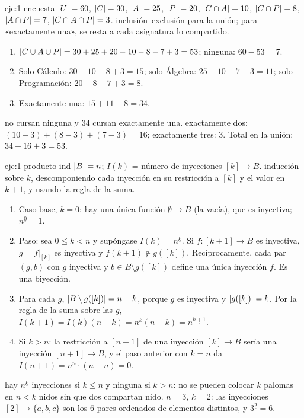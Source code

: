 \begin{solucion}{eje:1-encuesta}
\datos $\lvert U\rvert=60$, $\lvert C\rvert=30$, $\lvert A\rvert=25$, $\lvert P\rvert=20$, $\lvert C\cap A\rvert=10$, $\lvert C\cap P\rvert=8$, $\lvert A\cap P\rvert=7$, $\lvert C\cap A\cap P\rvert=3$.
\planteamiento inclusión--exclusión para la unión; para «exactamente una», se resta a cada asignatura lo compartido.
\pasos
\begin{enumerate}[label=\arabic*.]
  \item $\lvert C\cup A\cup P\rvert=30+25+20-10-8-7+3=53$; ninguna: $60-53=7$.
  \item Solo Cálculo: $30-10-8+3=15$; solo Álgebra: $25-10-7+3=11$; solo Programación: $20-8-7+3=8$.
  \item Exactamente una: $15+11+8=34$.
\end{enumerate}
 no cursan ninguna y 34 cursan exactamente una.
\comprobacion exactamente dos: $(10-3)+(8-3)+(7-3)=16$; exactamente tres: 3. Total en la unión: $34+16+3=53$.
\end{solucion}

\begin{solucion}{eje:1-producto-ind}
\datos $\lvert B\rvert=n$; $I(k)$ = número de inyecciones $[k]\to B$.
\planteamiento inducción sobre $k$, descomponiendo cada inyección en su restricción a $[k]$ y el valor en $k+1$, y usando la regla de la suma.
\pasos
\begin{enumerate}[label=\arabic*.]
  \item Caso base, $k=0$: hay una única función $\emptyset\to B$ (la vacía), que es inyectiva; $n^{\underline0}=1$.
  \item Paso: sea $0\le k<n$ y supóngase $I(k)=n^{\underline k}$. Si $f\colon[k+1]\to B$ es inyectiva, $g=f|_{[k]}$ es inyectiva y $f(k+1)\notin g([k])$. Recíprocamente, cada par $(g,b)$ con $g$ inyectiva y $b\in B\setminus g([k])$ define una única inyección $f$. Es una biyección.
  \item Para cada $g$, $\lvert B\setminus g([k])\rvert=n-k$, porque $g$ es inyectiva y $\lvert g([k])\rvert=k$. Por la regla de la suma sobre las $g$, $I(k+1)=I(k)(n-k)=n^{\underline k}(n-k)=n^{\underline{k+1}}$.
  \item Si $k>n$: la restricción a $[n+1]$ de una inyección $[k]\to B$ sería una inyección $[n+1]\to B$, y el paso anterior con $k=n$ da $I(n+1)=n^{\underline n}\cdot(n-n)=0$.
\end{enumerate}
\resultado hay $n^{\underline k}$ inyecciones si $k\le n$ y ninguna si $k>n$: no se pueden colocar $k$ palomas en $n<k$ nidos sin que dos compartan nido.
\comprobacion $n=3$, $k=2$: las inyecciones $[2]\to\{a,b,c\}$ son los 6 pares ordenados de elementos distintos, y $3^{\underline2}=6$.
\end{solucion}

